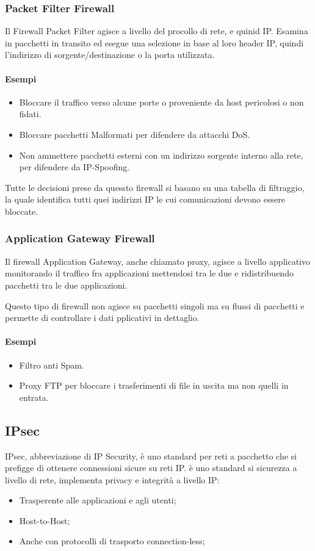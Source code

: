 \documentclass[12pt, a4paper, openany]{book}
\begin{document}
\subsubsection*{Packet Filter Firewall}
Il Firewall Packet Filter agisce a livello del procollo di rete, e quinid IP.
Esamina in pacchetti in transito ed esegue una selezione in base al loro header IP, quindi l'indirizzo di sorgente/destinazione o la porta utilizzata.

\paragraph*{Esempi}
\begin{itemize}
    \item Bloccare il traffico verso alcune porte o proveniente da host pericolosi o non fidati.
    \item Bloccare pacchetti Malformati per difendere da attacchi DoS.
    \item Non ammettere pacchetti esterni con un indirizzo sorgente interno alla rete, per difendere da IP-Spoofing. 
\end{itemize}

Tutte le decisioni prese da quessto firewall si basano su una tabella di filtraggio, la quale identifica tutti quei indirizzi IP le cui comunicazioni devono essere bloccate.

\subsubsection{Application Gateway Firewall}
Il firewall Application Gateway, anche chiamato proxy, agisce a livello applicativo
monitorando il traffico fra applicazioni mettendosi tra le due e ridistribuendo pacchetti tra le due applicazioni.

Questo tipo di firewall non agisce su pacchetti singoli ma su flussi di pacchetti e permette di controllare i dati pplicativi in dettaglio.

\paragraph*{Esempi}
\begin{itemize}
    \item Filtro anti Spam.
    \item Proxy FTP per bloccare i trasferimenti di file in uscita ma non quelli in entrata.
\end{itemize}

\subsection{IPsec}
IPsec, abbreviazione di IP Security, è uno standard per reti a pacchetto che si prefigge di ottenere connessioni sicure su reti IP.
è uno standard si sicurezza a livello di rete, implementa privacy e integrità a livello IP:
\begin{itemize}
    \item Trasperente alle applicazioni e agli utenti;
    \item Host-to-Host;
    \item Anche con protocolli di trasporto connection-less;
\end{itemize}
\end{document}
